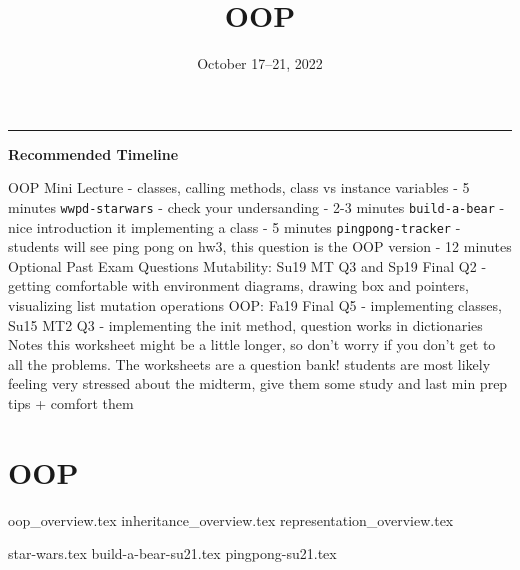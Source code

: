 \documentclass{exam}
\title{\textsc{OOP}}
\date{October 17--21, 2022}
\begin{document}
	\maketitle
	\rule{\textwidth}{0.15em}
	\fontsize{12}{15}\selectfont

\begin{guide}
	\textbf{Recommended Timeline}
	\begin{outline}[enumerate]
		\1 OOP Mini Lecture - classes, calling methods, class vs instance variables - 5 minutes
		\1 \lstinline{wwpd-starwars} - check your undersanding - 2-3 minutes
		\1 \lstinline{build-a-bear} - nice introduction it implementing a class - 5 minutes 
		\1 \lstinline{pingpong-tracker} - students will see ping pong on hw3, this question is the OOP version - 12 minutes
		\1 Optional Past Exam Questions
		\2 Mutability: Su19 MT Q3 and Sp19 Final Q2 - getting comfortable with environment diagrams, drawing box and pointers, visualizing list mutation operations
		\2 OOP: Fa19 Final Q5 - implementing classes, Su15 MT2 Q3 - implementing the init method, question works in dictionaries
		\1 Notes
		\2 this worksheet might be a little longer, so don't worry if you don't get to all the problems. The worksheets are a question bank!
		\2 students are most likely feeling very stressed about the midterm, give them some study and last min prep tips + comfort them
	\end{outline}
\end{guide}


\section{OOP}
{oop_overview.tex}
{inheritance_overview.tex}
{representation_overview.tex}
\newpage
\begin{questions}
{star-wars.tex}
\newpage
{build-a-bear-su21.tex}
{pingpong-su21.tex}
\end{questions}
\end{document}

